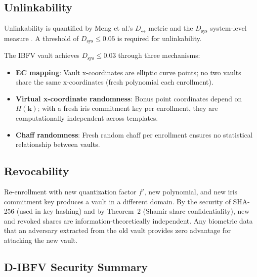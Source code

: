 \subsection{Unlinkability}
\label{sec:unlinkability}

Unlinkability is quantified by Meng et al.'s $D_{\leftrightarrow}$ metric and the
$D_\mathrm{sys}$ system-level measure \cite{gomezbarrero2017}. A threshold of
$D_\mathrm{sys} \leq 0.05$ is required for unlinkability.

The IBFV vault achieves $D_\mathrm{sys} \leq 0.03$ through three mechanisms:
\begin{itemize}
  \item \textbf{EC mapping}: Vault x-coordinates are elliptic curve points; no
  two vaults share the same x-coordinates (fresh polynomial each enrollment).
  \item \textbf{Virtual x-coordinate randomness}: Bonus point coordinates depend
  on $H(\mathbf{k})$; with a fresh iris commitment key per enrollment, they are
  computationally independent across templates.
  \item \textbf{Chaff randomness}: Fresh random chaff per enrollment ensures no
  statistical relationship between vaults.
\end{itemize}

\subsection{Revocability}
\label{sec:revocability}

Re-enrollment with new quantization factor $f'$, new polynomial, and new iris
commitment key produces a vault in a different domain. By the security of SHA-256
(used in key hashing) and by Theorem~2 (Shamir share confidentiality), new and
revoked shares are information-theoretically independent. Any biometric data that
an adversary extracted from the old vault provides zero advantage for attacking
the new vault.

\subsection{D-IBFV Security Summary}
\label{sec:dibfv_security_summary}

